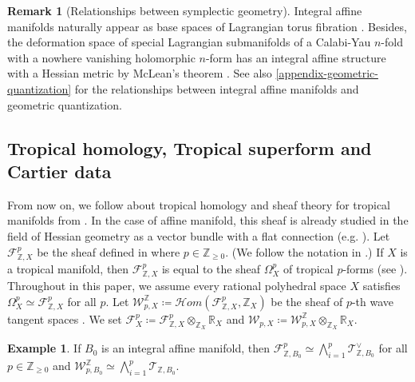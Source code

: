 \documentclass[a4paper,dvipdfmx,reqno,12pt]{amsart}
\theoremstyle{definition}
\newtheorem{example}[theorem]{Example}
\newtheorem{remark}[theorem]{Remark}
\newcommand{\deq}{\coloneqq}
\numberwithin{equation}{section}
\begin{document}
\begin{remark}[{Relationships between symplectic geometry}]
Integral affine manifolds naturally appear 
as base spaces of Lagrangian torus fibration 
\cite{duistermaatGlobalActionangleCoordinates1980a}. 
Besides, the deformation space of 
special Lagrangian submanifolds of
a Calabi-Yau $n$-fold with a nowhere vanishing 
holomorphic $n$-form has 
an integral affine structure with 
a Hessian metric by McLean's theorem \cite{MR1664890}.
See also \cref{appendix-geometric-quantization} 
for the relationships between integral affine manifolds 
and geometric quantization. 
\end{remark}


\subsection{Tropical homology, Tropical superform and Cartier data}
From now on, we follow about tropical homology and sheaf 
theory for tropical manifolds
from \cite{mikhalkinTropicalEigenwaveIntermediate2014a,
MR3903579,gross2019sheaftheoretic}.
In the case of affine manifold, this sheaf is already
studied in the field of Hessian geometry as a vector bundle
with a flat connection
(e.g. \cite[Chapter 7]{MR2293045}).
Let $\mathcal{F}^{p}_{\mathbb{Z},X}$ be 
the sheaf defined in 
\cite[2.4]{mikhalkinTropicalEigenwaveIntermediate2014a}
where $p\in \mathbb{Z}_{\geq 0}$.
 (We follow the notation in \cite[Definition 2.4]{MR3894860}.)
If $X$ is a tropical manifold, then 
$\mathcal{F}^{p}_{\mathbb{Z},X}$ is equal 
to the sheaf $\Omega_{X}^{p}$ of tropical $p$-forms 
\cite[Definition 2.7]{gross2019sheaftheoretic}
(see \cite[Remark 2.8]{gross2019sheaftheoretic}).
Throughout in this paper, we assume every rational polyhedral space $X$
satisfies $\Omega_X^{p}\simeq \mathcal{F}_{\mathbb{Z},X}^{p}$
for all $p$.
Let $\mathcal{W}_{p,X}^{\mathbb{Z}}
\deq \mathcal{H}om(\mathcal{F}^{p}_{\mathbb{Z},X},\mathbb{Z}_X)$
be the sheaf of $p$-th wave tangent spaces 
\cite{yamamotoTropicalContractionsIntegral2021,mikhalkinTropicalEigenwaveIntermediate2014a}.
We set $\mathcal{F}^{p}_{X}\deq 
\mathcal{F}^{p}_{\mathbb{Z}, X}
\otimes_{\mathbb{Z}_X}\mathbb{R}_X$ and 
$\mathcal{W}_{p,X}\deq 
\mathcal{W}_{p,X}^{\mathbb{Z}}
\otimes_{\mathbb{Z}_X}\mathbb{R}_X$.



\begin{example}
If $B_0$ is an integral affine manifold, then 
$\mathcal{F}^{p}_{\mathbb{Z},B_0}\simeq 
\bigwedge^{p}_{i=1} \mathcal{T}_{\mathbb{Z},B_0}^{\vee}$ for 
all $p\in \mathbb{Z}_{\geq 0}$ and
$\mathcal{W}^{\mathbb{Z}}_{p,B_0}\simeq 
\bigwedge_{i=1}^{p}\mathcal{T}_{\mathbb{Z},B_0}$.
\end{example}
\end{document}
